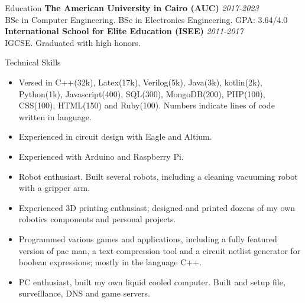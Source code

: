 \documentclass{resume}
\begin{document}
\begin{small}
	
	\begin{rSection}{Education}
		{\bf The American University in Cairo (AUC)} \hfill {\em 2017-2023} \\
		BSc in Computer Engineering. BSc in Electronics Engineering. GPA: 3.64/4.0\\
		{\bf International School for Elite Education (ISEE)} \hfill {\em 2011-2017}\\
		IGCSE. Graduated with high honors.
	\end{rSection}
	
	\begin{rSection}{Technical Skills}
		\begin{itemize}
			\itemsep-0.4em
			\item Versed in C++(32k), Latex(17k), Verilog(5k), Java(3k), kotlin(2k), Python(1k), Javascript(400), SQL(300), MongoDB(200), PHP(100), CSS(100), HTML(150) and Ruby(100). Numbers indicate lines of code written in language.
			\item Experienced in circuit design with Eagle and Altium.
			\item Experienced with Arduino and Raspberry Pi.
			\item Robot enthusiast. Built several robots, including a cleaning vacuuming robot with a gripper arm.
			\item Experienced 3D printing enthusiast; designed and printed dozens of my own robotics components and personal projects.
			\item Programmed various games and applications, including a fully featured version of pac man, a text compression tool and a circuit netlist generator for boolean expressions; mostly in the language C++.
			\item PC enthusiast, built my own liquid cooled computer. Built and setup file, surveillance, DNS and game servers.
		\end{itemize}
	\end{rSection}


\end{small}
\end{document}
